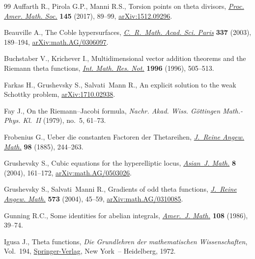 \documentclass[11pt]{article}
\numberwithin{equation}{section}
\numberwithin{equation}{section}
\begin{document}
\begin{thebibliography}{99}
Auffarth R., Pirola G.P., Manni R.S., Torsion points on theta divisors,
 \href{https://doi.org/10.1090/proc/13230}{\textit{Proc. Amer. Math. Soc.}} \textbf{145} (2017), 89--99,
 \href{https://arxiv.org/abs/1512.09296}{arXiv:1512.09296}.

Beauville A., The {C}oble hypersurfaces, \href{https://doi.org/10.1016/S1631-073X(03)00302-9}{\textit{C.~R.~Math. Acad. Sci. Paris}}
 \textbf{337} (2003), 189--194, \href{https://arxiv.org/abs/math.AG/0306097}{arXiv:math.AG/0306097}.

Buchstaber V., Krichever I., Multidimensional vector addition theorems and the
 {R}iemann theta functions, \href{https://doi.org/10.1155/S1073792896000347}{\textit{Int. Math. Res. Not.}} \textbf{1996}
 (1996), 505--513.

Farkas H., Grushevsky S., Salvati~Mann R., An explicit solution to the weak
 Schottky problem, \href{https://arxiv.org/abs/1710.02938}{arXiv:1710.02938}.

Fay J., On the {R}iemann--{J}acobi formula, \textit{Nachr. Akad. Wiss.
 G\"{o}ttingen Math.-Phys. Kl.~II} (1979), no.~5, 61--73.

Frobenius G., Ueber die constanten {F}actoren der {T}hetareihen,
 \href{https://doi.org/10.1515/crll.1885.98.244}{\textit{J.~Reine Angew. Math.}} \textbf{98} (1885), 244--263.

Grushevsky S., Cubic equations for the hyperelliptic locus, \href{https://doi.org/10.4310/AJM.2004.v8.n1.a12}{\textit{Asian~J.
 Math.}} \textbf{8} (2004), 161--172, \href{https://arxiv.org/abs/math.AG/0503026}{arXiv:math.AG/0503026}.

Grushevsky S., Salvati~Manni R., Gradients of odd theta functions,
 \href{https://doi.org/10.1515/crll.2004.063}{\textit{J.~Reine Angew. Math.}} \textbf{573} (2004), 45--59,
 \href{https://arxiv.org/abs/math.AG/0310085}{arXiv:math.AG/0310085}.

Gunning R.C., Some identities for abelian integrals, \href{https://doi.org/10.2307/2374468}{\textit{Amer.~J. Math.}} \textbf{108} (1986), 39--74.

Igusa J., Theta functions, \textit{Die Grundlehren der mathematischen
 Wissenschaften}, Vol.~194, \href{https://doi.org/10.1007/978-3-642-65315-5}{Springer-Verlag}, New York~-- Heidelberg, 1972.


\end{thebibliography}
\end{document}
